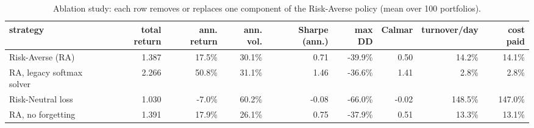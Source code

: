 \begin{table}[ht!]
\centering
\footnotesize
\setlength{\tabcolsep}{4pt}
\begin{tabular}{lrrrrrrrr}
\hline
strategy & total return & ann. return & ann. vol. & Sharpe (ann.) & max DD & Calmar & turnover/day & cost paid \\
\hline
Risk-Averse (RA) & 1.387 & 17.5\% & 30.1\% & 0.71 & -39.9\% & 0.50 & 14.2\% & 14.1\% \\
RA, legacy softmax solver & 2.266 & 50.8\% & 31.1\% & 1.46 & -36.6\% & 1.41 & 2.8\% & 2.8\% \\
Risk-Neutral loss & 1.030 & -7.0\% & 60.2\% & -0.08 & -66.0\% & -0.02 & 148.5\% & 147.0\% \\
RA, no forgetting & 1.391 & 17.9\% & 26.1\% & 0.75 & -37.9\% & 0.51 & 13.3\% & 13.1\% \\
\hline
\end{tabular}
\caption{Ablation study: each row removes or replaces one component of the Risk-Averse policy (mean over 100 portfolios).}
\label{tab:ablation_covid}
\end{table}
